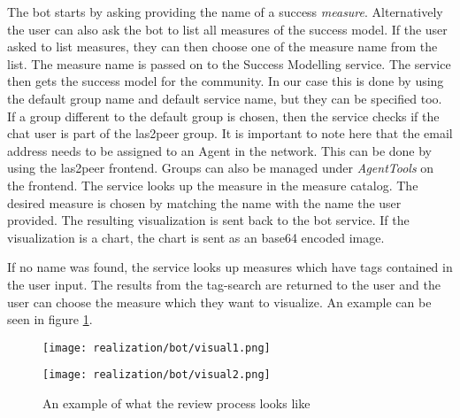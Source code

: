 The bot starts by asking providing the name of a success \emph{measure}. Alternatively the user can also ask the bot to list all measures of the success model.
If the user asked to list measures, they can then choose one of the measure name from the list. 
The measure name is passed on to the Success Modelling service. The service then gets the success model for the community. In our case this is done by using the default group name and default service name, but they can be specified too.
If a group different to the default group is chosen, then the service checks if the chat user is part of the las2peer group. 
It is important to note here that the email address needs to be assigned to an Agent in the network. 
This can be done by using the las2peer frontend. 
Groups can also be managed under \emph{AgentTools} on the frontend.  
The service looks up the measure in the measure catalog. The desired measure is chosen by matching the name with the name the user provided. 
The resulting visualization is sent back to the bot service. If the visualization is a chart, the chart is sent as an base64 encoded image.

If no name was found, the service looks up measures which have tags contained in the user input. The results from the tag-search are returned to the user and the user can choose the measure which they want to visualize.
An example can be seen in figure \ref{fig:visualReq}.

\begin{figure}[h]
    \begin{minipage}[t]{0.5\textwidth}
        \centering
\vspace{0pt}

        \texttt{[image: realization/bot/visual1.png]} 
    \end{minipage}
    \begin{minipage}[t]{0.5\textwidth}
        \centering
\vspace{0pt}

        \texttt{[image: realization/bot/visual2.png]}
    \end{minipage}
    \caption{An example of what the review process looks like}
    \label{fig:visualReq}
\end{figure}


